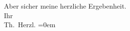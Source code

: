 \pstart
           Aber sicher meine herzliche Ergebenheit.{\\[\baselineskip]}Ihr{\\[\baselineskip]}\spacefill\mbox{Th. Herzl.}\pend
           \leftskip=0em{}\endnumbering{}
\begin{anhang}
\end{anhang}
      